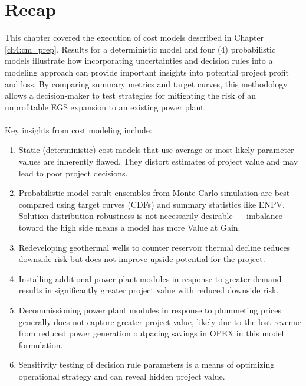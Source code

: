 \section{Recap}

This chapter covered the execution of cost models described in Chapter \ref{ch4:cm_prep}. Results for a deterministic model and four (4) probabilistic models illustrate how incorporating uncertainties and decision rules into a modeling approach can provide important insights into potential project profit and loss. By comparing summary metrics and target curves, this methodology allows a decision-maker to test strategies for mitigating the risk of an unprofitable EGS expansion to an existing power plant.
\\
\\
Key insights from cost modeling include:
\begin{enumerate}
    \item Static (deterministic) cost models that use average or most-likely parameter values are inherently flawed. They distort estimates of project value and may lead to poor project decisions.
    \item Probabilistic model result ensembles from Monte Carlo simulation are best compared using target curves (CDFs) and summary statistics like ENPV. Solution distribution robustness is not necessarily desirable --- imbalance toward the high side means a model has more Value at Gain.
    \item Redeveloping geothermal wells to counter reservoir thermal decline reduces downside risk but does not improve upside potential for the project.
    \item Installing additional power plant modules in response to greater demand results in significantly greater project value with reduced downside risk.
    \item Decommissioning power plant modules in response to plummeting prices generally does not capture greater project value, likely due to the lost revenue from reduced power generation outpacing savings in OPEX in this model formulation.
    \item Sensitivity testing of decision rule parameters is a means of optimizing operational strategy and can reveal hidden project value.
\end{enumerate}

